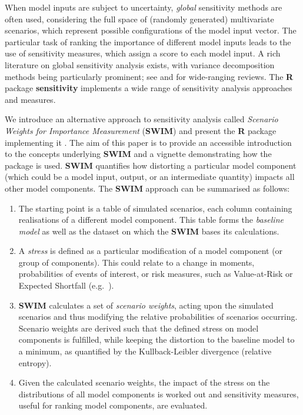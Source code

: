 \documentclass[
]{article}
\begin{document}
When model inputs are subject to uncertainty, \emph{global} sensitivity methods are often used, considering the full space of (randomly generated) multivariate scenarios, which represent possible configurations of the model input vector. The particular task of ranking the importance of different model inputs leads to the use of sensitivity measures, which assign a score to each model input. A rich literature on global sensitivity analysis exists, with variance decomposition methods being particularly prominent; see \citet{Saltelli2008} and \citet{Borgonovo2016} for wide-ranging reviews. The \textbf{R} package \textbf{sensitivity} \citep{Rsensitivity} implements a wide range of sensitivity analysis approaches and measures.

We introduce an alternative approach to sensitivity analysis called \emph{Scenario Weights for Importance Measurement} (\textbf{SWIM}) and present the \textbf{R} package implementing it \citep{PesentiR}. The aim of this paper is to provide an accessible introduction to the concepts underlying \textbf{SWIM} and a vignette demonstrating how the package is used. \textbf{SWIM} quantifies how distorting a particular model component (which could be a model input, output, or an intermediate quantity) impacts all other model components. The \textbf{SWIM} approach can be summarised as follows:

\begin{enumerate}
\def\labelenumi{\arabic{enumi}.}
\item
  The starting point is a table of simulated scenarios, each column containing realisations of a different model component. This table forms the \emph{baseline model} as well as the dataset on which the \textbf{SWIM} bases its calculations.
\item
  A \emph{stress} is defined as a particular modification of a model component (or group of components). This could relate to a change in moments, probabilities of events of interest, or risk measures, such as Value-at-Risk or Expected Shortfall (e.g.~\citet{Mcneil2015B}).
\item
  \textbf{SWIM} calculates a set of \emph{scenario weights}, acting upon the simulated scenarios and thus modifying the relative probabilities of scenarios occurring. Scenario weights are derived such that the defined stress on model components is fulfilled, while keeping the distortion to the baseline model to a minimum, as quantified by the Kullback-Leibler divergence (relative entropy).
\item
  Given the calculated scenario weights, the impact of the stress on the distributions of all model components is worked out and sensitivity measures, useful for ranking model components, are evaluated.
\end{enumerate}
\end{document}
